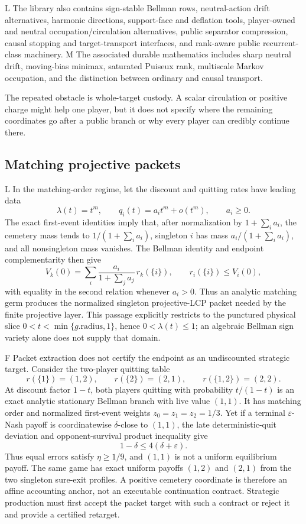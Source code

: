 \documentclass[11pt]{article}
\newcommand{\LTag}{\textsf{L}}
\newcommand{\MTag}{\textsf{M}}
\newcommand{\FTag}{\textsf{F}}
\newcommand{\Prod}{\LTag}
\newcommand{\Audit}{\MTag}
\newcommand{\Refuted}{\FTag}
\newcommand{\Status}[1]{#1}
\begin{document}
\Status{\Prod} The library also contains sign-stable Bellman rows,
neutral-action drift alternatives, harmonic directions, support-face and
deflation tools, player-owned and neutral occupation/circulation alternatives,
public separator compression, causal stopping and target-transport
interfaces, and rank-aware public recurrent-class machinery.
\Status{\Audit} The associated durable mathematics includes sharp neutral
drift, moving-bias minimax, saturated Puiseux rank, multiscale Markov
occupation, and the distinction between ordinary and causal transport.

The repeated obstacle is whole-target custody.  A scalar circulation or
positive charge might help one player, but it does not specify where the
remaining coordinates go after a public branch or why every player can
credibly continue there.

\subsection{Matching projective packets}

\Status{\Prod} In the matching-order regime, let the discount and quitting
rates have leading data
\[
  \lambda(t)=t^m,\qquad
  q_i(t)=a_i t^m+o(t^m),\qquad a_i\geq0.
\]
The exact first-event identities imply that, after normalization by
\(1+\sum_i a_i\), the cemetery mass tends to
\(1/(1+\sum_i a_i)\), singleton \(i\) has mass
\(a_i/(1+\sum_i a_i)\), and all nonsingleton mass vanishes.  The Bellman
identity and endpoint complementarity then give
\[
 V_k(0)=\sum_i\frac{a_i}{1+\sum_j a_j}\,r_k(\{i\}),
 \qquad r_i(\{i\})\leq V_i(0),
\]
with equality in the second relation whenever \(a_i>0\).  Thus an analytic
matching germ produces the normalized singleton projective-LCP packet needed
by the finite projective layer.  This passage explicitly restricts to the
punctured physical slice \(0<t<\min\{g.\mathrm{radius},1\}\), hence
\(0<\lambda(t)\leq1\); an algebraic Bellman
sign variety alone does not supply that domain.

\Status{\Refuted} Packet extraction does not certify the endpoint as an
undiscounted strategic target.  Consider the two-player quitting table
\[
 r(\{1\})=(1,2),\qquad
 r(\{2\})=(2,1),\qquad
 r(\{1,2\})=(2,2).
\]
At discount factor \(1-t\), both players quitting with probability
\(t/(1-t)\) is an exact analytic stationary Bellman branch with live value
\((1,1)\).  It has matching order and normalized first-event weights
\(z_0=z_1=z_2=1/3\).  Yet if a terminal \(\varepsilon\)-Nash payoff is
coordinatewise \(\delta\)-close to \((1,1)\), the late deterministic-quit
deviation and opponent-survival product inequality give
\[
  1-\delta \leq 4(\delta+\varepsilon).
\]
Thus equal errors satisfy \(\eta\geq1/9\), and \((1,1)\) is not a uniform
equilibrium payoff.  The same game has exact uniform payoffs \((1,2)\) and
\((2,1)\) from the two singleton sure-exit profiles.  A positive cemetery
coordinate is therefore an affine accounting anchor, not an executable
continuation contract.  Strategic production must first accept the packet
target with such a contract or reject it and provide a certified retarget.
\end{document}
